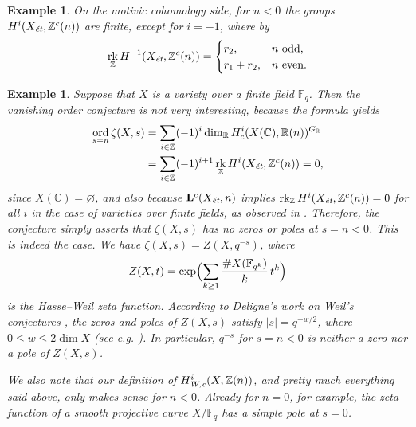 \documentclass[10pt,a4paper,oneside]{article}
\DeclareMathOperator{\ord}{ord}
\DeclareMathOperator{\rk}{rk}
\newcommand{\CC}{\mathbb{C}}
\newcommand{\FF}{\mathbb{F}}
\newcommand{\RR}{\mathbb{R}}
\newcommand{\ZZ}{\mathbb{Z}}
\renewcommand{\emptyset}{\varnothing}
\newcommand{\et}{\text{\it \'{e}t}}
\newcommand{\Wc}{\text{\it W,c}}
\theoremstyle{myplain}
\theoremstyle{mydefinition}
\newtheorem{example}[theorem]{Example}
\numberwithin{equation}{section}
\begin{document}
\begin{example}
  On the motivic cohomology side, for $n < 0$ the groups
  $H^i (X_\et, \ZZ^c (n))$ are finite, except for $i = -1$, where by
  \cite[Proposition~4.14]{Geisser-2017}
  \[ \rk_\ZZ H^{-1} (X_\et, \ZZ^c (n)) = \begin{cases}
      r_2, & n \text{ odd},\\
      r_1 + r_2, & n \text{ even}.
    \end{cases} \]
\end{example}

\begin{example}
  Suppose that $X$ is a variety over a finite field $\FF_q$. Then the vanishing
  order conjecture is not very interesting, because the formula yields
  \begin{align*}
    \ord_{s=n} \zeta (X,s) & = \sum_{i \in \ZZ} (-1)^i \dim_\RR H^i_c (X(\CC), \RR (n))^{G_\RR} \\
                           & = \sum_{i \in \ZZ} (-1)^{i+1} \rk_\ZZ H^i (X_\et, \ZZ^c (n)) = 0,
  \end{align*}
  since $X (\CC) = \emptyset$, and also because $\mathbf{L}^c (X_\et, n)$
  implies $\rk_\ZZ H^i (X_\et, \ZZ^c (n)) = 0$ for all $i$ in the case of
  varieties over finite fields, as observed in
  \cite[Proposition~4.2]{Beshenov-Weil-etale-1}. Therefore, the conjecture
  simply asserts that $\zeta (X,s)$ has no zeros or poles at $s = n < 0$.  This
  is indeed the case. We have $\zeta (X,s) = Z (X,q^{-s})$, where
  $$Z (X,t) = \exp \Bigl(\sum_{k\ge 1} \frac{\# X (\FF_{q^k})}{k}\,t^k\Bigr)$$
  is the Hasse--Weil zeta function. According to Deligne's work on Weil's
  conjectures \cite{Deligne-Weil-II}, the zeros and poles of $Z (X,s)$ satisfy
  $|s| = q^{-w/2}$, where $0 \le w \le 2 \dim X$
  (see e.g. \cite[pp.\,26--27]{Katz-1994}). In particular, $q^{-s}$ for
  $s = n < 0$ is neither a zero nor a pole of $Z (X,s)$.

  We also note that our definition of $H^i_\Wc (X, \ZZ(n))$, and pretty much
  everything said above, only makes sense for $n < 0$. Already for $n = 0$, for
  example, the zeta function of a smooth projective curve $X/\FF_q$ has a simple
  pole at $s = 0$.
\end{example}
\end{document}
